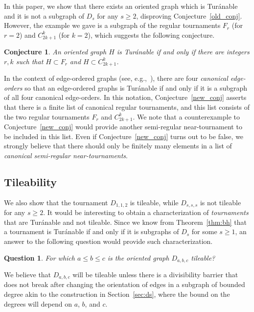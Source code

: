 \documentclass[11pt]{amsart}
\newtheorem{question}[theorem]{Question}
\newtheorem{conjecture}[theorem]{Conjecture}
\begin{document}
In this paper, we show that there exists an oriented graph which is Tur\'anable and it is not a subgraph of $D_{s}$ for any $s \ge 2$, disproving Conjecture~\ref{old_conj}. However, the example we gave is a subgraph of the regular tournaments $F_r$ (for $r=2$) and $C_{2k+1}^k$ (for $k=2$), which suggests the following conjecture.

\setcounter{theorem}{7} \setcounter{section}{1}
\begin{conjecture}
    An oriented graph $H$ is Tur\'anable if and only if there are integers $r, k$ such that $H \subset F_r$ and $H \subset C_{2k+1}^k$.
\end{conjecture}
\setcounter{section}{6} \setcounter{theorem}{0}

In the context of edge-ordered graphs (see, e.g.,~\cite{APTX, GMNPTV}), there are four \emph{canonical edge-orders} so that an edge-ordered graphs is Tur\'anable if and only if it is a subgraph of all four canonical edge-orders. In this notation, Conjecture~\ref{new_conj} asserts that there is a finite list of canonical regular tournaments, and this list consists of the two regular tournaments $F_r$ and $C_{2k+1}^k$. We note that a counterexample to Conjecture~\ref{new_conj} would provide another semi-regular near-tournament to be included in this list. Even if Conjecture~\ref{new_conj} turns out to be false, we strongly believe that there should only be finitely many elements in a list of \emph{canonical semi-regular near-tournaments}.  

\subsection{Tileability}

We also show that the tournament $D_{1,1,2}$ is tileable, while $D_{s,s,s}$ is not tileable for any $s\ge 2$. It would be interesting to obtain a characterization of \emph{tournaments} that are Tur\'anable and not tileable. 
Since we know from Theorem~\ref{thm:bh} that a tournament is Tur\'anable if and only if it is subgraphs of $D_s$ for some $s\ge 1$, an answer to the following question would provide such characterization.

\begin{question} 
    For which $a\le b \le c$ is the oriented graph $D_{a,b,c}$ tileable?
\end{question}

We believe that $D_{a,b,c}$ will be tileable unless there is a divisibility barrier that does not break after changing the orientation of edges in a subgraph of bounded degree akin to the construction in Section~\ref{sec:ds}, where the bound on the degrees will depend on $a$, $b$, and $c$.
\end{document}
